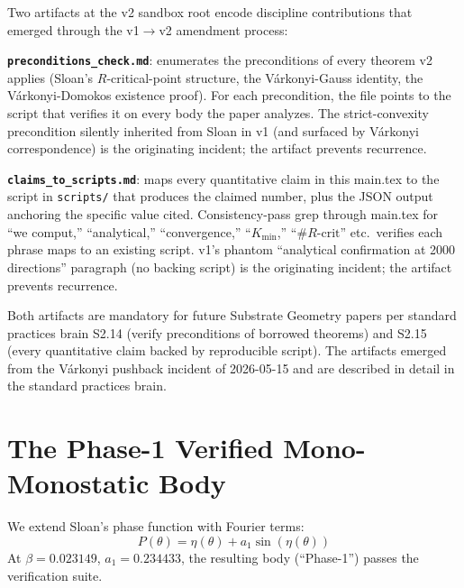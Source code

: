 \documentclass[11pt,a4paper]{article}
\begin{document}
Two artifacts at the v2 sandbox root encode discipline
contributions that emerged through the v1$\to$v2 amendment process:

\textbf{\texttt{preconditions\_check.md}}: enumerates the
preconditions of every theorem v2 applies (Sloan's
$R$-critical-point structure, the V\'arkonyi-Gauss identity, the
V\'arkonyi-Domokos existence proof). For each precondition, the
file points to the script that verifies it on every body the paper
analyzes. The strict-convexity precondition silently inherited from
Sloan in v1 (and surfaced by V\'arkonyi correspondence) is the
originating incident; the artifact prevents recurrence.

\textbf{\texttt{claims\_to\_scripts.md}}: maps every quantitative
claim in this main.tex to the script in \texttt{scripts/} that
produces the claimed number, plus the JSON output anchoring the
specific value cited. Consistency-pass grep through main.tex for
``we comput,'' ``analytical,'' ``convergence,'' ``$K_{\min}$,''
``$\#R\text{-crit}$'' etc.\ verifies each phrase maps to an existing
script. v1's phantom ``analytical confirmation at 2000 directions''
paragraph (no backing script) is the originating incident; the
artifact prevents recurrence.

Both artifacts are mandatory for future Substrate Geometry papers
per standard practices brain S2.14 (verify preconditions of borrowed
theorems) and S2.15 (every quantitative claim backed by reproducible
script). The artifacts emerged from the V\'arkonyi pushback incident
of 2026-05-15 and are described in detail in the standard practices
brain.

\section{The Phase-1 Verified Mono-Monostatic Body}
\label{sec:phase1_verified}

We extend Sloan's phase function with Fourier terms:
\begin{equation}
P(\theta) = \eta(\theta) + a_1 \sin(\eta(\theta))
\label{eq:phase_ext}
\end{equation}
At $\beta = 0.023149$, $a_1 = 0.234433$, the resulting body
(``Phase-1'') passes the verification suite.
\end{document}
